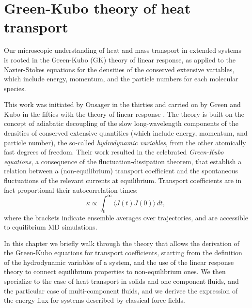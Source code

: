 \chapter{Green-Kubo theory of heat transport}  \label{ch:green-kubo}

Our microscopic understanding of heat and mass transport in extended systems is rooted in the Green-Kubo (GK) theory of linear response,\cite{Green1954,Kubo1957a} as applied to the Navier-Stokes equations for the densities of the conserved extensive variables,\cite{Kadanoff1963,Forster1975} which include energy, momentum, and the particle numbers for each molecular species. 
\begin{LEtext}

This work was initiated by Onsager in the thirties \cite{Onsager1931a,Onsager1931b} and carried on by Green and Kubo in the fifties with the theory of linear response \cite{Green1952,Green1954,Kubo1957a,Kubo1957b}. The theory is built on the concept of adiabatic decoupling of the slow long-wavelength components of the densities of conserved extensive quantities (which include energy, momentum, and particle number), \cite{Kadanoff1963} the so-called \emph{hydrodynamic variables}, from the other atomically fast degrees of freedom. Their work resulted in the celebrated \emph{Green-Kubo equations}, a consequence of the fluctuation-dissipation theorem, that establish a relation between a (non-equilibrium) transport coefficient and the spontaneous fluctuations of the relevant currents at equilibrium. Transport coefficients are in fact proportional their autocorrelation times:
\begin{equation}
\kappa\propto\int_{0}^{\infty}\!\langle{J}(t){J}(0)\rangle\, dt, \label{eq:GK}
\end{equation}
where the brackets indicate ensemble averages over trajectories, and are accessible to equilibrium MD simulations.

In this chapter we briefly walk through the theory that allows the derivation of the Green-Kubo equations for transport coefficients, starting from the definition of the hydrodynamic variables of a system, and the use of the linear response theory to connect equilibrium properties to non-equilibrium ones. We then specialize to the case of heat transport in solids and one component fluids, and the particular case of multi-component fluids, and we derivee the expression of the energy flux for systems described by classical force fields.
\end{LEtext}


